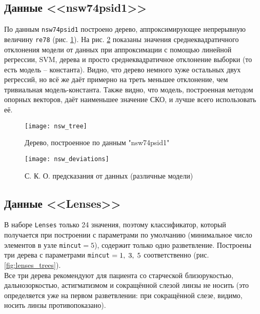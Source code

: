 \documentclass[a4paper,12pt]{article} %
\newcommand{\myPictWidth}{.95\textwidth}
\begin{document}
\subsection{Данные <<nsw74psid1>>}

По данным \texttt{nsw74psid1} построено дерево, аппроксимирующее непрерывную величину \texttt{re78} (рис. \ref{fig:nsw_tree}).
На рис. \ref{fig:nsw_sd} показаны значения среднеквадратичного отклонения модели от данных при аппроксимации с помощью линейной регрессии, SVM, дерева и просто среднеквадратичное отклонение выборки (то есть модель -- константа).
Видно, что дерево немного хуже остальных двух регрессий, но всё же даёт примерно на треть меньшее отклонение, чем тривиальная модель-константа. Также видно, что модель, построенная методом опорных векторов, даёт наименьшее значение СКО, и лучше всего использовать её.

\begin{figure}[H]
    \centering \texttt{[image: nsw\_tree]}
    \caption{Дерево, построенное по данным "nsw74psid1" }
    \label{fig:nsw_tree}
\end{figure}

\begin{figure}[H]
    \centering \texttt{[image: nsw\_deviations]}
    \caption{ С. К. О. предсказания от данных (различные модели) }
    \label{fig:nsw_sd}
\end{figure}

\subsection{Данные <<Lenses>>}

В наборе \texttt{Lenses} только 24 значения, поэтому классификатор, который получается при построении с параметрами по умолчанию (минимальное число элементов в узле \texttt{mincut}$=5$), содержит только одно разветвление. Построены три дерева с параметрами \texttt{mincut} $ = 1, \thickspace 3, \thickspace 5 $ соответственно (рис. \ref{fig:lenses_trees}). \\

Все три дерева рекомендуют для пациента со старческой близорукостью, дальнозоркостью, астигматизмом и сокращённой слезой линзы не носить (это определяется уже на первом разветвлении: при сокращённой слезе, видимо, носить линзы противопоказано).
\end{document}
